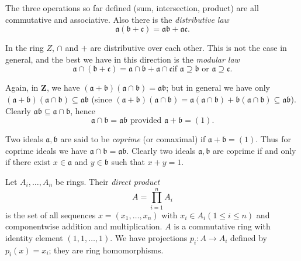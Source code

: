 \documentclass[class=book, crop=false]{standalone}
\theoremstyle{definition}
\theoremstyle{remark}
\begin{document}
The three operations so far defined (sum, intersection, product) are all
commutative and associative. Also there is the \textit{distributive law}
\[
  \mathfrak{a}(\mathfrak{b}+\mathfrak{c})=\mathfrak{a} \mathfrak{b}+\mathfrak{a} \mathfrak{c} .
\]

In the ring $Z$, $\cap$ and $+$ are distributive over each other. This is not
the case in general, and the best we have in this direction is the
\textit{modular law}
\[
  \mathfrak{a} \cap(\mathfrak{b}+\mathfrak{c})=\mathfrak{a} \cap \mathfrak{b}+\mathfrak{a} \cap \mathfrak{c} \text{
    if
  } \mathfrak{a} \supseteq \mathfrak{b} \text { or } \mathfrak{a} \supseteq \mathfrak{c}.
\]

Again, in $\mathbf{Z}$, we have
$(\mathfrak{a}+\mathfrak{b})(\mathfrak{a} \cap \mathfrak{b})=\mathfrak{a} \mathfrak{b}$;
but in general we have only
$(\mathfrak{a}+\mathfrak{b})(\mathfrak{a} \cap \mathfrak{b}) \subseteq \mathfrak{a} \mathfrak{b}$
(since
$(\mathfrak{a}+\mathfrak{b})(\mathfrak{a} \cap \mathfrak{b})=\mathfrak{a}(\mathfrak{a} \cap \mathfrak{b})+\mathfrak{b}(\mathfrak{a} \cap \mathfrak{b}) \subseteq \mathfrak{a} \mathfrak{b}$).
Clearly $\mathfrak{a} \mathfrak{b} \subseteq \mathfrak{a} \cap \mathfrak{b}$,
hence
\[
  \mathfrak{a} \cap \mathfrak{b}=\mathfrak{a} \mathfrak{b} \text{ provided
  } \mathfrak{a}+\mathfrak{b}=(1).
\]

Two ideals $\mathfrak{a}, \mathfrak{b}$ are said to be \textit{coprime} (or
comaximal) if $\mathfrak{a}+\mathfrak{b}=(1)$. Thus for coprime ideals we have
$\mathfrak{a} \cap \mathfrak{b}=\mathfrak{a} \mathfrak{b}$. Clearly two ideals
$\mathfrak{a}, \mathfrak{b}$ are coprime if and only if there exist
$x \in \mathfrak{a}$ and $y \in \mathfrak{b}$ such that $x+y=1$.

Let $A_{i}, \ldots, A_{n}$ be rings. Their \textit{direct product}
\[
  A=\prod_{i=1}^{n} A_{i}
\]
is the set of all sequences $x=\left(x_{1}, \ldots, x_{n}\right)$ with
$x_{i} \in A_{i}(1 \leq i \leq n)$ and componentwise addition and
multiplication. $A$ is a commutative ring with identity element
$(1,1, \ldots, 1)$. We have projections $p_{i}: A \to A_{i}$ defined by
$p_{i}(x)=x_{i}$; they are ring homomorphisms.
\end{document}
